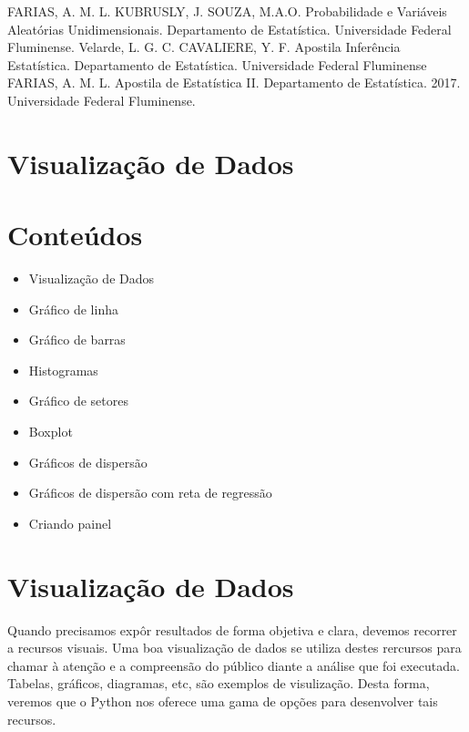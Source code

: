 \documentclass[
  letterpaper,
  DIV=11,
  numbers=noendperiod]{scrreprt}
\providecommand{\tightlist}{%
  \setlength{\itemsep}{0pt}\setlength{\parskip}{0pt}}\usepackage{longtable,booktabs,array}
\begin{document}
FARIAS, A. M. L. KUBRUSLY, J. SOUZA, M.A.O. Probabilidade e Variáveis
Aleatórias Unidimensionais. Departamento de Estatística. Universidade
Federal Fluminense. Velarde, L. G. C. CAVALIERE, Y. F. Apostila
Inferência Estatística. Departamento de Estatística. Universidade
Federal Fluminense FARIAS, A. M. L. Apostila de Estatística II.
Departamento de Estatística. 2017. Universidade Federal Fluminense.


\hypertarget{visualizauxe7uxe3o-de-dados}{%
\chapter{Visualização de Dados}\label{visualizauxe7uxe3o-de-dados}}


\hypertarget{conteuxfados-3}{%
\chapter{Conteúdos}\label{conteuxfados-3}}

\begin{itemize}
\tightlist
\item
  Visualização de Dados
\item
  Gráfico de linha
\item
  Gráfico de barras
\item
  Histogramas
\item
  Gráfico de setores
\item
  Boxplot
\item
  Gráficos de dispersão
\item
  Gráficos de dispersão com reta de regressão
\item
  Criando painel
\end{itemize}


\hypertarget{visualizauxe7uxe3o-de-dados-1}{%
\chapter{Visualização de Dados}\label{visualizauxe7uxe3o-de-dados-1}}

Quando precisamos expôr resultados de forma objetiva e clara, devemos
recorrer a recursos visuais. Uma boa visualização de dados se utiliza
destes rercursos para chamar à atenção e a compreensão do público diante
a análise que foi executada. Tabelas, gráficos, diagramas, etc, são
exemplos de visulização. Desta forma, veremos que o Python nos oferece
uma gama de opções para desenvolver tais recursos.
\end{document}
